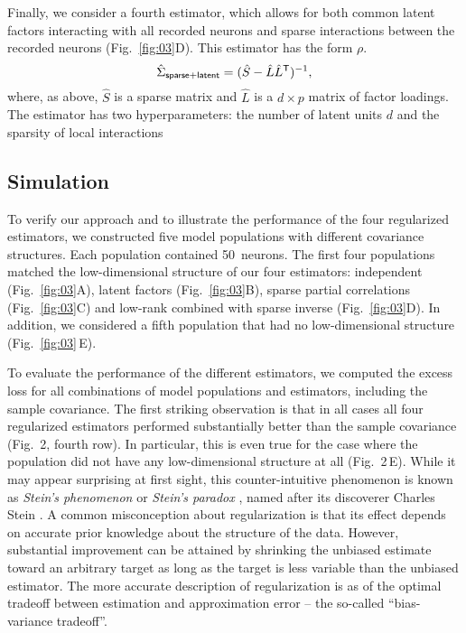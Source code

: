 Finally, we consider a fourth estimator, which allows for both common latent factors interacting with all recorded neurons and sparse interactions between the recorded neurons (Fig.~\ref{fig:03}D). This estimator has the form
$\rho$.
\begin{equation}
\hat\Sigma_{\sf sparse+latent} = (\hat S - \hat L\hat L^{\sf T})^{-1},
\end{equation}
where, as above, $\hat S$ is a sparse matrix and $\hat L$ is a $d\times p$ matrix of factor loadings. The estimator has two hyperparameters: the number of latent units $d$ and the sparsity of local interactions 
\subsection*{Simulation}

To verify our approach and to illustrate the performance of the four regularized estimators, we constructed five model populations with different covariance structures. Each population contained 50~neurons. 
The first four populations matched the low-dimensional structure of our four estimators: independent (Fig.~\ref{fig:03}A), latent factors (Fig.~\ref{fig:03}B), sparse partial correlations (Fig.~\ref{fig:03}C) and low-rank combined with sparse inverse (Fig.~\ref{fig:03}D).  
In addition, we considered a fifth population that had no low-dimensional structure (Fig.~\ref{fig:03}\,E).



To evaluate the performance of the different estimators, we computed the excess loss for all combinations of model populations and estimators, including the sample covariance. The first striking observation is that in all cases all four regularized estimators performed substantially better than the sample covariance (Fig.~2, fourth row). In particular, this is even true for the case where the population did not have any low-dimensional structure at all (Fig.~2\,E). While it may appear surprising at first sight, this counter-intuitive phenomenon is known as \emph{Stein's phenomenon} or \emph{Stein's paradox} \cite{Efron:1977}, named after its discoverer Charles Stein \cite{Stein:1956}. A common misconception about regularization is that its effect depends on accurate prior knowledge about the structure of the data. However, substantial improvement can be attained by shrinking the unbiased estimate toward an arbitrary target as long as the target is less variable than the unbiased estimator. The more accurate description of regularization is as of the optimal tradeoff between estimation and approximation error -- the so-called ``bias-variance tradeoff''.

